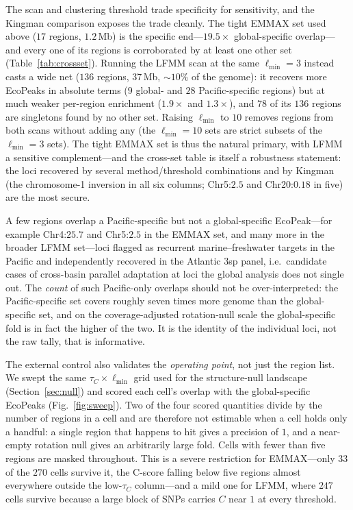 \documentclass[11pt]{article}
\begin{document}
The scan and clustering threshold trade specificity for sensitivity, and the
Kingman comparison exposes the trade cleanly. The tight EMMAX set used above ($17$
regions, $1.2$\,Mb) is the specific end---$19.5\times$ global-specific overlap---and
every one of its regions is corroborated by at least one other set
(Table~\ref{tab:crossset}). Running the LFMM scan at the same $\ell_{\min} = 3$
instead casts a wide net ($136$ regions, $37$\,Mb, $\sim\!10\%$ of the genome): it
recovers more EcoPeaks in absolute terms ($9$ global- and $28$ Pacific-specific
regions) but at much weaker per-region enrichment ($1.9\times$ and $1.3\times$), and
$78$ of its $136$ regions are singletons found by no other set. Raising $\ell_{\min}$
to $10$ removes regions from both scans without adding any (the $\ell_{\min}=10$
sets are strict subsets of the $\ell_{\min}=3$ sets). The tight EMMAX set is thus
the natural primary, with LFMM a sensitive complement---and the cross-set table is
itself a robustness statement: the loci recovered by several method/threshold
combinations and by Kingman (the chromosome-1 inversion in all six columns; Chr5:$2.5$
and Chr20:$0.18$ in five) are the most secure.

A few regions overlap a Pacific-specific but not a global-specific EcoPeak---for
example Chr4:$25.7$ and Chr5:$2.5$ in the EMMAX set, and many more in the broader
LFMM set---loci flagged as recurrent marine--freshwater targets in the Pacific and
independently recovered in the Atlantic 3sp panel, i.e.\ candidate cases of
cross-basin parallel adaptation at loci the global analysis does not single out. The
\emph{count} of such Pacific-only overlaps should not be over-interpreted: the
Pacific-specific set covers roughly seven times more genome than the global-specific
set, and on the coverage-adjusted rotation-null scale the global-specific fold is in
fact the higher of the two. It is the identity of the individual loci, not the raw
tally, that is informative.

The external control also validates the \emph{operating point}, not just the region
list. We swept the same $\tau_C \times \ell_{\min}$ grid used for the structure-null
landscape (Section~\ref{sec:null}) and scored each cell's overlap with the
global-specific EcoPeaks (Fig.~\ref{fig:sweep}). Two of the four scored quantities
divide by the number of regions in a cell and are therefore not estimable when a cell
holds only a handful: a single region that happens to hit gives a precision of $1$, and a
near-empty rotation null gives an arbitrarily large fold. Cells with fewer than five
regions are masked throughout. This is a severe restriction for EMMAX---only $33$ of the
$270$ cells survive it, the C-score falling below five regions almost everywhere outside
the low-$\tau_C$ column---and a mild one for LFMM, where $247$ cells survive because a
large block of SNPs carries $C$ near $1$ at every threshold.
\end{document}
